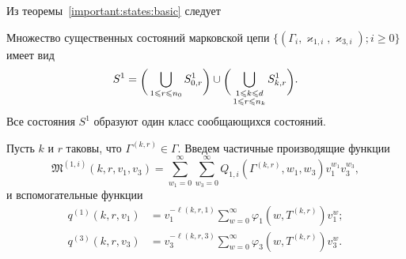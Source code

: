 Из теоремы~\ref{important:states:basic} следует 
\begin{theorem}
Множество существенных состояний марковской цепи $\{(\Gamma_i,  \varkappa_{1, i}, \varkappa_{3, i}); i \geqslant 0\}$ имеет вид 
$$
S^{1}=\raisebox{-.5ex}{$\biggl($}\bigcup\limits_{1 \leqslant r \leqslant n_0}S^1_{0, r}\raisebox{-.5ex}{$\biggr)$}\cup \raisebox{-.5ex}{$\biggl($}\bigcup\limits_{\substack{1 \leqslant k \leqslant d\\ 1 \leqslant r \leqslant n_k}} S^1_{k, r}\raisebox{-.5ex}{$\biggr)$}.
$$
Все состояния $S^{1}$ образуют один класс сообщающихся состояний.
\end{theorem}
Пусть $k$ и $r$ таковы,  что $\Gamma^{(k, r)}\in \Gamma$. Введем частичные производящие функции
\begin{equation*}
\mathfrak{M}^{(1, i)}(k, r, v_1, v_3) = \sum_{w_1=0}^{\infty}\sum_{w_3=0}^{\infty} Q_{1, i}(\Gamma^{(k, r)}, w_1, w_3) v_1^{w_1} v_3^{w_3},
\end{equation*}
и вспомогательные функции
\begin{align*}
q^{(1)}(k,r, v_1) &= v_1^{-\ell(k,r,1)}\sum_{w=0}^{\infty} \varphi_1(w,T^{(k,r)})v_1^w;\\
q^{(3)}(k,r, v_3) &= v_3^{-\ell(k,r,3)}\sum_{w=0}^{\infty} \varphi_3(w,T^{(k,r)})v_3^w.
\end{align*}

